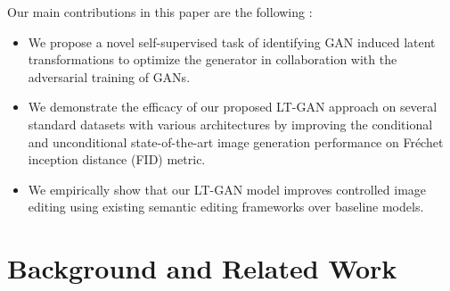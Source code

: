 \documentclass[10pt,twocolumn,letterpaper]{article}
\begin{document}
Our main contributions in this paper are the following :
\begin{itemize}

\item We propose a novel self-supervised task of identifying GAN induced latent transformations to optimize the generator in collaboration with the adversarial training of GANs.

\item We demonstrate the efficacy of our proposed LT-GAN approach on several standard datasets with various architectures by improving the conditional and unconditional state-of-the-art image generation performance on Fr\'echet inception distance (FID)\cite{fid2017martin} metric.


\item We empirically show that our LT-GAN model improves controlled image editing using existing semantic editing frameworks \cite{interface2020shen,controlling2020iclr} over baseline models.






\end{itemize}
 


\section{Background and Related Work}
\end{document}
